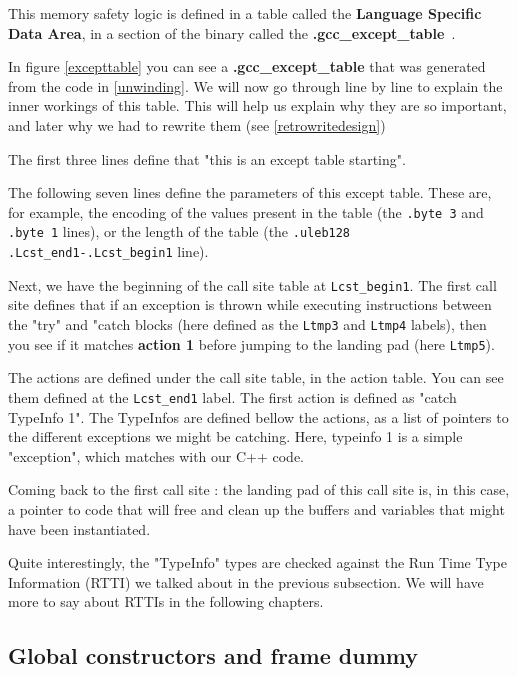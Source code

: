 \documentclass[a4paper,11pt,oneside]{report}
\begin{document}
This memory safety logic is defined in a table called the \textbf{Language
Specific Data Area}, in a section of the binary called the
\textbf{.gcc\_except\_table}~\cite{airsexcepttable}.

In figure \autoref{excepttable} you can see a \textbf{.gcc\_except\_table} that was
generated from the code in \autoref{unwinding}. We will now go through line by
line to explain the inner workings of this table.
This will help us explain why they are so important, and later why we had to
rewrite them (see \autoref{retrowritedesign})

The first three lines define that "this is an except table starting".

The following seven lines define the parameters of this except table.
These are, for example, the encoding of the values present in the table (the
\texttt{.byte 3} and \texttt{.byte 1} lines), or the length of the table (the
\texttt{.uleb128 .Lcst\_end1-.Lcst\_begin1} line).

Next, we have the beginning of the call site table at \texttt{Lcst\_begin1}.
The first call site defines that if an exception is thrown while executing
instructions between the "try" and "catch blocks (here defined as the
\texttt{Ltmp3} and \texttt{Ltmp4} labels), then you see if it matches
\textbf{action 1} before jumping to the landing pad (here \texttt{Ltmp5}).

The actions are defined under the call site table, in the action table. You
can see them defined at the \texttt{Lcst\_end1} label.
The first action is defined as "catch TypeInfo 1". The TypeInfos are defined
bellow the actions, as a list of pointers to the different exceptions we might
be catching. Here, typeinfo 1 is a simple "exception", which matches with our
C++ code.

Coming back to the first call site : the landing pad of this call site is, in
this case, a pointer to code that will free and clean up the buffers and
variables that might have been instantiated.

Quite interestingly, the "TypeInfo" types are checked against the Run Time
Type Information (RTTI) we talked about in the previous subsection.
We will have more to say about RTTIs in the following chapters.

\subsection{Global constructors and frame dummy}
\label{framedummy}
\end{document}
